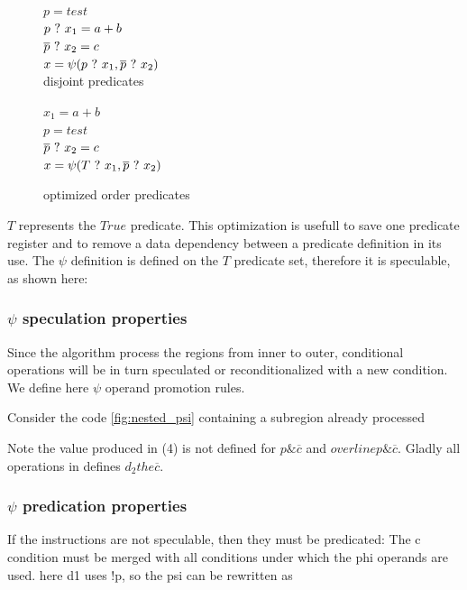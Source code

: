 \begin{figure}
\footnotesize
\begin{minipage}{6cm}
$ p = test $ \\
$ p ~?~ x_1 = a + b $ \\
$ \overline{p} ~?~ x_2 = c $ \\
$ x = \psi(p ~?~ x_1, \overline{p} ~?~ x_2) $ \\
\caption{disjoint predicates}
\end{minipage}
\begin{minipage}{6cm}
$ x_1 = a + b $ \\
$ p = test $ \\
$ \overline{p} ~?~ x_2 = c $ \\
$ x = \psi(T ~?~ x_1, \overline{p} ~?~ x_2) $ \\
\caption{optimized order predicates}
\end{minipage}
\end{figure}

$T$ represents the $True$ predicate. This optimization is usefull to save one predicate register and to remove a data dependency between a predicate definition in its use. 
The $\psi$ definition is defined on the $T$ predicate set, therefore it is speculable, as shown here:

\subsubsection{$\psi$ speculation properties}

Since the algorithm process the regions from inner to outer, conditional operations will be in turn speculated or reconditionalized with a new condition. We define here $\psi$ operand promotion rules.

Consider the code \ref{fig:nested_psi}  containing a subregion already processed

Note the value produced in (4) is not defined for $p \& \overline{c}$ and $overline{p} \& \overline{c}$. Gladly all operations in defines $d_2 the \overline{c}$.

\subsubsection{$\psi$ predication properties}

If the instructions are not speculable, then they must be predicated:
The c condition must be merged with all conditions under which the phi operands are used. here d1 uses !p, so the psi can be rewritten as

